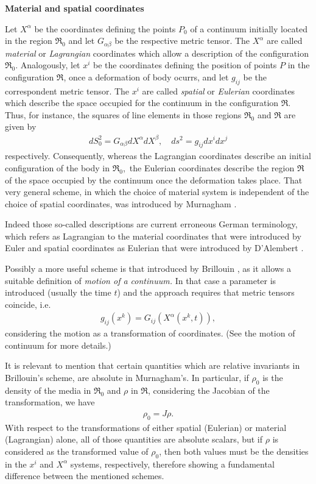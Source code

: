 \documentclass[12pt]{article}
\begin{document}
\textbf{Material and spatial coordinates}

Let $X^\alpha$ be the coordinates defining the points $P_0$ of a continuum initially located in the region $\Re_0$ and let $G_{\alpha\beta}$ be the respective metric tensor. The $X^\alpha$ are called {\em material} or {\em Lagrangian} coordinates which allow a description of the configuration $\Re_0$. Analogously, let $x^i$ be the coordinates defining the position of points $P$ in the configuration $\Re$, once a deformation of body ocurrs, and let $g_{ij}$ be the correspondent metric tensor. The $x^i$ are called {\em spatial} or {\em Eulerian} coordinates which describe the space occupied for the continuum in the configuration $\Re$.\, Thus, for instance, the squares of line elements in those regions $\Re_0$ and $\Re$ are given by
\begin{align*}
 dS_0^2=G_{\alpha\beta}dX^\alpha dX^\beta, \quad ds^2=g_{ij}dx^i dx^j
\end{align*}
respectively. Consequently, whereas the Lagrangian coordinates describe an initial configuration of the body in $\Re_0$,\, the Eulerian coordinates describe the region $\Re$ of the space occupied by the continuum once the deformation takes place. That very general scheme, in which the choice of material system is independent of the choice of spatial coordinates, was introduced by Murnagham \cite{cite:Murnagham}.

Indeed those so-called descriptions are current erroneous German terminology, which refers as Lagrangian to the material coordinates that were introduced by Euler \cite{cite:Euler} and spatial coordinates as Eulerian that were introduced by D'Alembert \cite{cite:D'Alembert}.

Possibly a more useful scheme is that introduced by Brillouin \cite{cite:Brillouin}, as it allows a suitable definition of {\em motion of a continuum.} In that case a parameter is introduced (usually the time $t$) and the approach requires that metric tensors coincide, i.e.
\begin{align*}
g_{ij}(x^k)=G_{ij}(X^\alpha(x^k,t)),
\end{align*}
considering the motion as a transformation of coordinates. (See the motion of continuum for more details.)

It is relevant to mention that certain quantities which are relative invariants in Brillouin's scheme, are absolute in Murnagham's. In particular, if $\rho_0$ is the density of the media in $\Re_0$ and $\rho$ in $\Re$, considering the Jacobian of the transformation, we have
\begin{align*}
\rho_0=J\rho.
\end{align*}
With respect to the transformations of either spatial (Eulerian) or material (Lagrangian) alone, all of those quantities are absolute scalars, but if $\rho$ is considered as the transformed value of $\rho_0$, then both values must be the densities in the $x^i$ and $X^\alpha$ systems, respectively, therefore showing a fundamental difference between the mentioned schemes.
\end{document}
